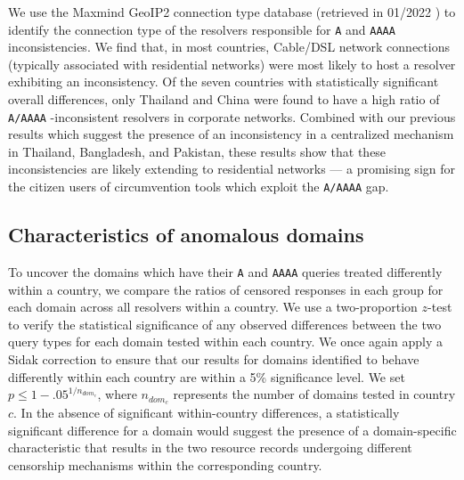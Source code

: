 %
We use the Maxmind GeoIP2 connection type database (retrieved in 01/2022
\cite{maxmind-connectiondb}) to identify the connection type of the resolvers
responsible for {\tt A} and {\tt AAAA} inconsistencies. 
%
We find that, in most countries, Cable/DSL network connections (typically
associated with residential networks) were most likely to host a resolver
exhibiting an inconsistency. 
%
Of the seven countries with statistically significant overall differences, only
Thailand and China were found to have a high ratio of {\tt A/AAAA} -inconsistent
resolvers in corporate networks. 
%
Combined with our previous results which suggest the presence of an
inconsistency in a centralized mechanism in Thailand, Bangladesh, and Pakistan,
these results show that these inconsistencies are likely extending to
residential networks --- a promising sign for the citizen users of
circumvention tools which exploit the {\tt A/AAAA} gap.

\subsection{Characteristics of anomalous domains} 
\label{sec:resources:domains}

To uncover the domains which have their {\tt A} and {\tt AAAA} queries treated
differently within a country, we compare the ratios of censored responses in
each group for each domain across all resolvers within a country.  
%
We use a two-proportion $z$-test to verify the statistical significance of any
observed differences between the two query types for each domain tested within
each country. We once again apply a Sidak correction to ensure that our results
for domains identified to behave differently within each country are within
a 5\% significance level. We set $p \leq 1-{.05}^{1/n_{dom_{c}}}$, where
$n_{dom_{c}}$ represents the number of domains tested in country $c$.
%
In the absence of significant within-country differences, a statistically
significant difference for a domain would suggest the presence of
a domain-specific characteristic that results in the two resource records
undergoing different censorship mechanisms within the corresponding country.


